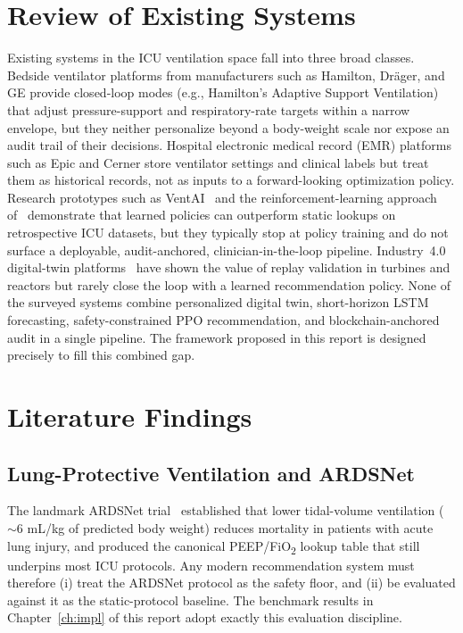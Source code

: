 \documentclass[12pt,a4paper,oneside]{report}
\begin{document}
\section{Review of Existing Systems}
Existing systems in the ICU ventilation space fall into three broad classes. Bedside ventilator platforms from manufacturers such as Hamilton, Dr\"ager, and GE provide closed-loop modes (e.g., Hamilton's Adaptive Support Ventilation) that adjust pressure-support and respiratory-rate targets within a narrow envelope, but they neither personalize beyond a body-weight scale nor expose an audit trail of their decisions. Hospital electronic medical record (EMR) platforms such as Epic and Cerner store ventilator settings and clinical labels but treat them as historical records, not as inputs to a forward-looking optimization policy. Research prototypes such as VentAI~\cite{kondrup2023} and the reinforcement-learning approach of~\cite{peine2021,prasad2017} demonstrate that learned policies can outperform static lookups on retrospective ICU datasets, but they typically stop at policy training and do not surface a deployable, audit-anchored, clinician-in-the-loop pipeline. Industry~4.0 digital-twin platforms~\cite{tao2018,fahim2022} have shown the value of replay validation in turbines and reactors but rarely close the loop with a learned recommendation policy. None of the surveyed systems combine personalized digital twin, short-horizon LSTM forecasting, safety-constrained PPO recommendation, and blockchain-anchored audit in a single pipeline. The framework proposed in this report is designed precisely to fill this combined gap.

\section{Literature Findings}

\subsection{Lung-Protective Ventilation and ARDSNet}
The landmark ARDSNet trial~\cite{ards2000} established that lower tidal-volume ventilation ($\sim 6$ mL/kg of predicted body weight) reduces mortality in patients with acute lung injury, and produced the canonical PEEP/FiO\textsubscript{2} lookup table that still underpins most ICU protocols. Any modern recommendation system must therefore (i) treat the ARDSNet protocol as the safety floor, and (ii) be evaluated against it as the static-protocol baseline. The benchmark results in Chapter~\ref{ch:impl} of this report adopt exactly this evaluation discipline.
\end{document}
